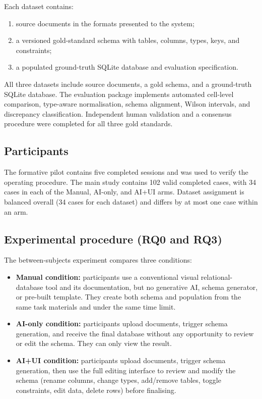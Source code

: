 \documentclass[11pt,a4paper]{article}
\begin{document}
Each dataset contains:
\begin{enumerate}
  \item source documents in the formats presented to the system;
  \item a versioned gold-standard schema with tables, columns, types, keys,
  and constraints;
  \item a populated ground-truth SQLite database and evaluation specification.
\end{enumerate}

All three datasets include source documents, a gold schema, and a ground-truth SQLite database. The evaluation package implements automated cell-level comparison, type-aware normalisation, schema alignment, Wilson intervals, and discrepancy classification. Independent human validation and a consensus procedure were completed for all three gold standards.

\subsection{Participants}
The formative pilot contains five completed sessions and was used to verify the operating procedure. The main study contains 102 valid completed cases, with 34 cases in each of the Manual, AI-only, and AI+UI arms. Dataset assignment is balanced overall (34 cases for each dataset) and differs by at most one case within an arm.

\subsection{Experimental procedure (RQ0 and RQ3)}
The between-subjects experiment compares three conditions:

\begin{itemize}
  \item \textbf{Manual condition:} participants use a conventional visual relational-database tool and its documentation, but no generative AI, schema generator, or pre-built template. They create both schema and population from the same task materials and under the same time limit.
  \item \textbf{AI-only condition:} participants upload documents, trigger schema generation, and receive the final database without any opportunity to review or edit the schema. They can only view the result.
  \item \textbf{AI+UI condition:} participants upload documents, trigger schema generation, then use the full editing interface to review and modify the schema (rename columns, change types, add/remove tables, toggle constraints, edit data, delete rows) before finalising.
\end{itemize}
\end{document}
